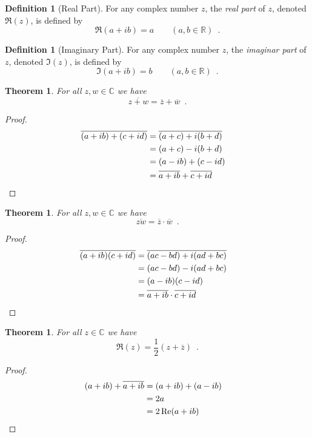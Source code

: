 \documentclass{book}
\let\qed\relax
\newtheorem{thm}[prop]{Theorem}
\theoremstyle{definition}
\newtheorem{df}[prop]{Definition}
\begin{document}
\begin{df}[Real Part]
For any complex number $z$, the \emph{real part} of $z$, denoted $\Re(z)$, is defined by
\[ \Re(a + ib) = a \qquad (a,b \in \mathbb{R}) \enspace . \]
\end{df}

\begin{df}[Imaginary Part]
For any complex number $z$, the \emph{imaginar part} of $z$, denoted $\Im(z)$, is defined by
\[ \Im(a + ib) = b \qquad (a,b \in \mathbb{R}) \enspace . \]
\end{df}

\begin{thm}
For all $z,w \in \mathbb{C}$ we have
\[ \overline{z + w} = \overline{z} + \overline{w} \enspace . \]
\end{thm}

\begin{proof}
\pf
\begin{align*}
\overline{(a + ib) + (c + id)} & = \overline{(a + c) + i (b + d)} \\
& = (a + c) - i(b+ d) \\
& = (a-ib) + (c-id) \\
& = \overline{a + ib} + \overline{c + id} & \qed
\end{align*}
\end{proof}

\begin{thm}
For all $z,w \in \mathbb{C}$ we have
\[ \overline{zw} = \overline{z} \cdot \overline{w} \enspace . \]
\end{thm}

\begin{proof}
\pf
\begin{align*}
\overline{(a+ib)(c+id)} & = \overline{(ac-bd) + i(ad+bc)} \\
& = (ac-bd)-i(ad+bc) \\
& = (a-ib)(c-id) \\
& = \overline{a+ib} \cdot \overline{c+id} & \qed
\end{align*}
\end{proof}

\begin{thm}
\label{thm:Re_z_plus_zbar}
For all $z \in \mathbb{C}$ we have
\[ \Re(z) = \frac{1}{2} (z + \overline{z}) \enspace . \]
\end{thm}

\begin{proof}
\pf
\begin{align*}
(a+ib) + \overline{a+ib} & = (a+ib) + (a-ib) \\
& = 2a \\
& = 2 \Re(a+ib) & \qed
\end{align*}
\end{proof}
\end{document}
